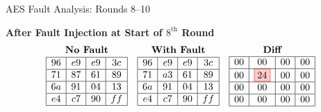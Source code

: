 \documentclass{beamer}
\newenvironment{tres important}[2][]{
	\setkeys{EmphEqEnv}{#2}
	\setkeys{EmphEqOpt}{box={\setlength{\fboxsep}{10pt}\fcolorbox{myNewColorA}{white}},#1}
	\EmphEqMainEnv}
{\endEmphEqMainEnv}
\begin{document}
  \begin{frame}[fragile]{AES Fault Analysis: Rounds 8–10}
    \scriptsize %
    
    \textbf{After Fault Injection at Start of $8^{\text{th}}$ Round}
    \[
    \begin{array}{ccc}
    \textbf{No Fault} & \textbf{With Fault} & \textbf{Diff} \\
    \begin{array}{|c|c|c|c|} \hline
    96 & e9 & e9 & 3c \\ \hline
    71 & 87 & 61 & 89 \\ \hline
    6a & 91 & 04 & 13 \\ \hline
    e4 & c7 & 90 & ff \\ \hline
    \end{array}
    &
    \begin{array}{|c|c|c|c|} \hline
    96 & e9 & e9 & 3c \\ \hline
    71 & a3 & 61 & 89 \\ \hline
    6a & 91 & 04 & 13 \\ \hline
    e4 & c7 & 90 & ff \\ \hline
    \end{array}
    &
    \begin{array}{|c|c|c|c|} \hline
    00 & 00 & 00 & 00 \\ \hline
    00 & \fcolorbox{red}{red!20}{24} & 00 & 00 \\ \hline
    00 & 00 & 00 & 00 \\ \hline
    00 & 00 & 00 & 00 \\ \hline
    \end{array}
    \end{array}
    \]
    

\end{frame}
\end{document}
